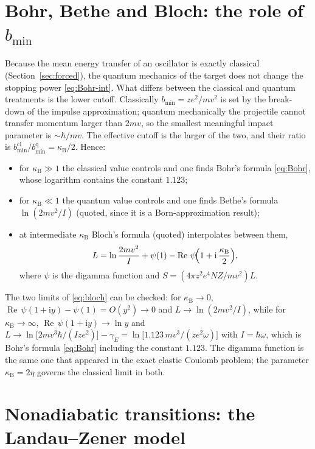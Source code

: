 \documentclass[11pt,a4paper]{book}
\numberwithin{equation}{chapter}
\newcommand{\ii}{\mathrm{i}}
\newcommand{\Real}{\operatorname{Re}}
\newcommand{\kB}{\kappa_{\mathrm B}}
\begin{document}
\section{Bohr, Bethe and Bloch: the role of $b_{\min}$}\label{sec:bloch}

Because the mean energy transfer of an oscillator is exactly classical
(Section~\ref{sec:forced}), the quantum mechanics of the target does not change
the stopping power \eqref{eq:Bohr-int}. What differs between the classical and
quantum treatments is the lower cutoff. Classically $b_{\min}=ze^2/mv^2$ is set by
the break-down of the impulse approximation; quantum mechanically the projectile
cannot transfer momentum larger than $2mv$, so the smallest meaningful impact
parameter is $\sim\hbar/mv$. The effective cutoff is the larger of the two, and
their ratio is $b_{\min}^{\mathrm{cl}}/b_{\min}^{\mathrm{q}}=\kB/2$. Hence:
\begin{itemize}
  \item for $\kB\gg1$ the classical value controls and one finds Bohr's formula
        \eqref{eq:Bohr}, whose logarithm contains the constant $1.123$;
  \item for $\kB\ll1$ the quantum value controls and one finds Bethe's formula
        $\ln(2mv^2/I)$ (quoted, since it is a Born-approximation result);
  \item at intermediate $\kB$ Bloch's formula (quoted) interpolates between them,
        \begin{equation}\label{eq:bloch}
          L=\ln\frac{2mv^2}{I}+\psi(1)-\Real\,\psi\!\Bigl(1+\ii\,\frac{\kB}{2}\Bigr),
        \end{equation}
        where $\psi$ is the digamma function and $S=(4\pi z^2e^4NZ/mv^2)L$.
\end{itemize}
The two limits of \eqref{eq:bloch} can be checked: for $\kB\to0$,
$\Real\,\psi(1+\ii y)-\psi(1)=O(y^2)\to0$ and $L\to\ln(2mv^2/I)$, while for
$\kB\to\infty$, $\Real\,\psi(1+\ii y)\to\ln y$ and
$L\to\ln\bigl[2mv^3\hbar/(Ize^2)\bigr]-\gamma_E=\ln\bigl[1.123\,mv^3/(ze^2\omega)\bigr]$
with $I=\hbar\omega$, which is Bohr's formula \eqref{eq:Bohr} including the
constant $1.123$. The digamma function is the same one that appeared in the exact
elastic Coulomb problem; the parameter $\kB=2\eta$ governs the classical limit in
both.

\section{Nonadiabatic transitions: the Landau--Zener model}\label{sec:LZ}
\end{document}
